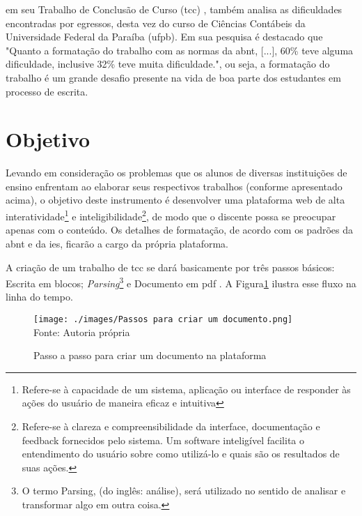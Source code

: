 \clearpage

\cite{santos}
em seu Trabalho de Conclusão de Curso
(\acrshort{tcc})
, também analisa as
dificuldades encontradas por egressos, desta vez do curso de Ciências Contábeis da
Universidade Federal da Paraíba
(\acrshort{ufpb}).
Em sua pesquisa é destacado que "Quanto a
formatação do trabalho com as normas da 
\acrshort{abnt}, {[}...{]}, 60\% teve alguma dificuldade, inclusive
32\% teve muita dificuldade.", ou seja, a formatação do trabalho é um grande desafio presente
na vida de boa parte dos estudantes em processo de escrita.

\section{Objetivo}

Levando em consideração os problemas que os alunos de diversas instituições de ensino enfrentam ao elaborar seus respectivos
trabalhos (conforme apresentado acima), o objetivo deste instrumento é desenvolver uma plataforma web de alta
interatividade\footnote{Refere-se à capacidade de um sistema, aplicação ou interface de responder
        às ações do usuário de maneira eficaz e intuitiva}
e
inteligibilidade\footnote{Refere-se à clareza e compreensibilidade da interface, documentação e feedback fornecidos pelo
    sistema. Um software inteligível facilita o entendimento do usuário sobre como utilizá-lo e quais são os resultados de suas ações.},
de modo que o discente possa se preocupar apenas com o conteúdo. Os detalhes de formatação, de acordo com os padrões da
\acrshort{abnt}
e da
\acrshort{ies},
ficarão a cargo da própria plataforma.

A criação de um trabalho de
\acrshort{tcc}
se dará basicamente por três passos básicos: Escrita em blocos;
\textit{Parsing}\footnote{O termo Parsing, (do inglês: análise), será utilizado no
sentido de analisar e transformar algo em outra coisa.}
e
Documento em
\acrshort{pdf}
. A Figura\ref{fig:Passos para criar um documento} ilustra esse fluxo na linha do tempo.

\begin{figure}[H]
    \centering
    \caption{Passo a passo para criar um documento na plataforma}
    \texttt{[image: ./images/Passos para criar um documento.png]}
    \label{fig:Passos para criar um documento} \\
    \textnormal{\fontsize{10pt}{12pt}Fonte: Autoria própria}
\end{figure}

